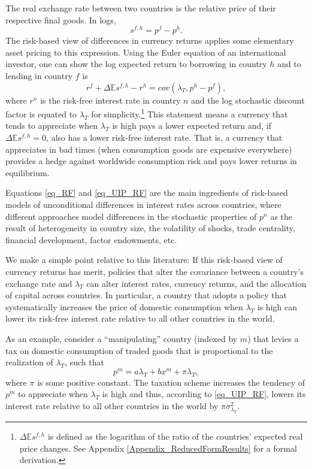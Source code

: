 \documentclass[12pt,letter]{article}
\theoremstyle{break} \theorembodyfont{\normalfont\itshape}
\theoremstyle{break}
\theoremstyle{break} \theorembodyfont{\normalfont\itshape}
\theoremstyle{break} \theorembodyfont{\normalfont\itshape}
\begin{document}
The real exchange rate between two countries is the relative price of
their respective final goods. In logs,
\[
  s^{f,h}=p^{f}-p^{h}.
\]%
The risk-based view of differences in currency returns applies some
elementary asset pricing to this expression. Using the Euler equation
of an international investor, one can show the log expected return to
borrowing in country $h$ and to lending in country $f$ is
\begin{equation}
  r^{f} + \Delta \mathbb{E} s^{f,h} - r^{h} =cov\left( \lambda _{T},p^{h}-p^{f}\right),
  \label{eq_UIP_RF}
\end{equation}%
where $r^{n}$ is the risk-free interest rate in country $n$ and the
log stochastic discount factor is equated to $\lambda_T$ for
simplicity.\footnote{$\Delta\mathbb{E}s^{f,h}$ is defined as the
  logarithm of the ratio of the countries' expected real price
  changes. See Appendix \ref{Appendix_ReducedFormResults} for a formal
  derivation.} This statement means a currency that tends to
appreciate when $\lambda_T$ is high pays a lower expected return and,
if $\Delta \mathbb{E} s^{f,h}=0$, also has a lower risk-free interest
rate. That is, a currency that appreciates in bad times (when
consumption goods are expensive everywhere) provides a hedge against
worldwide consumption risk and pays lower returns in equilibrium.

Equations \eqref{eq_RF} and \eqref{eq_UIP_RF} are the main ingredients
of risk-based models of unconditional differences in interest rates
across countries, where different approaches model differences in the
stochastic properties of \(p^n\) as the result of heterogeneity in
country size, the volatility of shocks, trade centrality, financial
development, factor endowments, etc.

We make a simple point relative to this literature: If this risk-based
view of currency returns has merit, policies that alter the covariance
between a country's exchange rate and $\lambda_T $ can alter interest
rates, currency returns, and the allocation of capital across
countries. In particular, a country that adopts a policy that
systematically increases the price of domestic consumption when
$\lambda _{T}$ is high can lower its risk-free interest rate relative
to all other countries in the world.

As an example, consider a ``manipulating'' country (indexed by $ m $)
that levies a tax on domestic consumption of traded goods that is
proportional to the realization of \(\lambda_{T}\), such that
\begin{equation*}
  p^{m}=a\lambda _{T}+b x^{m}+\pi \lambda_{T},
\end{equation*}%
where \(\pi\) is some positive constant. The taxation scheme increases
the tendency of \(p^{m}\) to appreciate when \(\lambda_{T}\) is high
and thus, according to \eqref{eq_UIP_RF}, lowers its interest rate
relative to all other countries in the world by
\(\pi \sigma^2_{\lambda_T}\).
\end{document}
